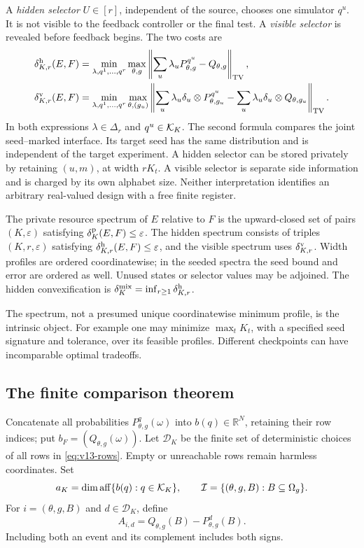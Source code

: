 A \emph{hidden selector} $U\in[r]$, independent of the source, chooses
one simulator $q^u$. It is not visible to the feedback controller or the
final test. A \emph{visible selector} is revealed before feedback begins.
The two costs are
\begin{align}
 \delta^{\rm h}_{K,r}(E,F)
 &=\min_{\lambda,q^1,\ldots,q^r}
   \max_{\theta,g}\left\|\sum_u\lambda_uP_{\theta,g}^{q^u}
                              -Q_{\theta,g}\right\|_{\rm TV},
                              \label{eq:v13-hidden}\\
 \delta^{\rm v}_{K,r}(E,F)
 &=\min_{\lambda,q^1,\ldots,q^r}
   \max_{\theta,(g_u)}
   \left\|\sum_u\lambda_u\delta_u\otimes P_{\theta,g_u}^{q^u}
             -\sum_u\lambda_u\delta_u\otimes Q_{\theta,g_u}
   \right\|_{\rm TV}.\label{eq:v13-visible}
\end{align}
In both expressions $\lambda\in\Delta_r$ and $q^u\in\mathcal K_K$.
The second formula compares the joint seed--marked interface. Its target
seed has the same distribution and is independent of the target
experiment. A hidden selector can be stored privately by retaining
$(u,m)$, at width $rK_t$. A visible selector is separate side information
and is charged by its own alphabet size. Neither interpretation identifies
an arbitrary real-valued design with a free finite register.

\begin{definition}\label{def:v13-spectrum}
The private resource spectrum of $E$ relative to $F$ is the upward-closed
set of pairs $(K,\varepsilon)$ satisfying $\delta^{\rm p}_K(E,F)\le\varepsilon$.
The hidden spectrum consists of triples $(K,r,\varepsilon)$ satisfying
$\delta^{\rm h}_{K,r}(E,F)\le\varepsilon$, and the visible spectrum uses
$\delta^{\rm v}_{K,r}$. Width profiles are ordered coordinatewise; in the seeded
spectra the seed bound and error are ordered as well. Unused states or
selector values may be adjoined. The hidden convexification is
$\delta^{\rm mix}_K=\inf_{r\ge1}\delta^{\rm h}_{K,r}$.
\end{definition}
The spectrum, not a presumed unique coordinatewise minimum profile, is
the intrinsic object. For example one may minimize $\max_tK_t$, with a
specified seed signature and tolerance, over its feasible profiles.
Different checkpoints can have incomparable optimal tradeoffs.

\subsection{The finite comparison theorem}
Concatenate all probabilities $P_{\theta,g}^q(\omega)$ into $b(q)\in
\mathbb R^N$, retaining their row indices; put $b_F=(Q_{\theta,g}(\omega))$.
Let $\mathcal D_K$ be the finite set of deterministic choices of all
rows in \eqref{eq:v13-rows}. Empty or unreachable rows remain harmless
coordinates. Set
\[
 a_K=\dim\operatorname{aff}\{b(q):q\in\mathcal K_K\},\qquad
 \mathcal I=\{(\theta,g,B):B\subseteq\Omega_g\}.
\]
For $i=(\theta,g,B)$ and $d\in\mathcal D_K$, define
\begin{equation}\label{eq:v13-matrix}
 A_{i,d}=Q_{\theta,g}(B)-P_{\theta,g}^{d}(B).
\end{equation}
Including both an event and its complement includes both signs.

